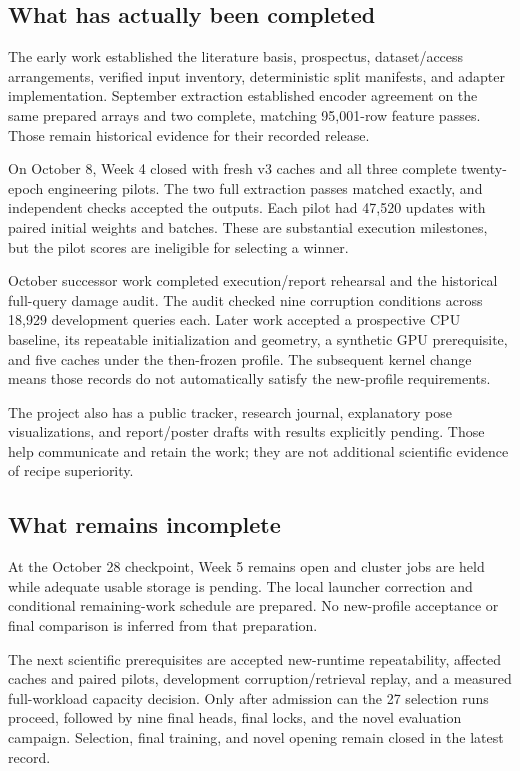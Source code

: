 \subsection{What has actually been completed}
The early work established the literature basis, prospectus, dataset/access
arrangements, verified input inventory, deterministic split manifests, and
adapter implementation. September extraction established encoder agreement on
the same prepared arrays and two complete, matching 95,001-row feature passes.
Those remain historical evidence for their recorded release.

On October 8, Week 4 closed with fresh v3 caches and all three complete
twenty-epoch engineering pilots. The two full extraction passes matched exactly,
and independent checks accepted the outputs. Each pilot had 47,520 updates with
paired initial weights and batches. These are substantial execution milestones,
but the pilot scores are ineligible for selecting a winner.

October successor work completed execution/report rehearsal and the historical
full-query damage audit. The audit checked nine corruption conditions across
18,929 development queries each. Later work accepted a prospective CPU baseline,
its repeatable initialization and geometry, a synthetic GPU prerequisite, and
five caches under the then-frozen profile. The subsequent kernel change means
those records do not automatically satisfy the new-profile requirements.

The project also has a public tracker, research journal, explanatory pose
visualizations, and report/poster drafts with results explicitly pending.
Those help communicate and retain the work; they are not additional scientific
evidence of recipe superiority.

\subsection{What remains incomplete}
At the October 28 checkpoint, Week 5 remains open and cluster jobs are held
while adequate usable storage is pending. The local launcher correction and
conditional remaining-work schedule are prepared. No new-profile acceptance
or final comparison is inferred from that preparation.

The next scientific prerequisites are accepted new-runtime repeatability,
affected caches and paired pilots, development corruption/retrieval replay,
and a measured full-workload capacity decision. Only after admission can the
27 selection runs proceed, followed by nine final heads, final locks, and the
novel evaluation campaign. Selection, final training, and novel opening remain
closed in the latest record.

